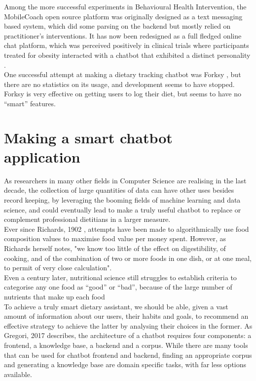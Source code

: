 Among the more successful experiments in Behavioural Health Intervention, the MobileCoach open source platform \cite{mobilecoacheu} was originally designed as a text messaging based system, which did some parsing on the backend but mostly relied on practitioner's interventions. It has now been redesigned as a full fledged online chat platform, which was perceived positively in clinical trials where participants treated for obesity interacted with a chatbot that exhibited a distinct personality \cite{Kowatsch2017}. \\
One successful attempt at making a dietary tracking chatbot was Forksy \cite{forksywebsite}, but there are no statistics on its usage, and development seems to have stopped. Forksy is very effective on getting users to log their diet, but seems to have no ``smart'' features.
\section{Making a smart chatbot application}
As researchers in many other fields in Computer Science are realising in the last decade, the collection of large quantities of data can have other uses besides record keeping, by leveraging the booming fields of machine learning and data science, and could eventually lead to make a truly useful chatbot to replace or complement professional dietitians in a larger measure. \\
Ever since Richards, 1902 \cite{Richards1902a}, attempts have been made to algorithmically use food composition values to maximise food value per money spent. However, as Richards herself notes, "we know too little of the effect on digestibility, of cooking, and of the combination of two or more foods in one dish, or at one meal, to permit of very close calculation". \\
Even a century later, nutritional science still struggles to establish criteria to categorise any one food as ``good'' or ``bad'', because of the large number of nutrients that make up each food \cite{USDAFoodandNutritionService2007} \\
To achieve a truly smart dietary assistant, we should be able, given a vast amount of information about our users, their habits and goals, to recommend an effective strategy to achieve the latter by analysing their choices in the former. As Gregori, 2017 \cite{Gregori} describes, the architecture of a chatbot requires four components: a frontend, a knowledge base, a backend and a corpus. While there are many tools that can be used for chatbot frontend and backend, finding an appropriate corpus and generating a knowledge base are domain specific tasks, with far less options available. \\
